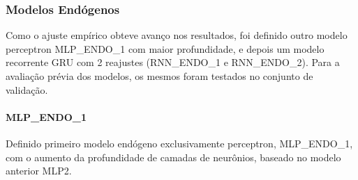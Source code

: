\documentclass[	12pt, Times, openright, twoside, a4paper, english, brazil]{abntex2}
\begin{document}
          \subsubsection{Modelos Endógenos}
    	        Como o ajuste empírico obteve avanço nos resultados, foi definido outro modelo perceptron MLP\_ENDO\_1 com maior profundidade, e depois um modelo recorrente GRU com 2 reajustes (RNN\_ENDO\_1 e RNN\_ENDO\_2).
                Para a avaliação prévia dos modelos, os mesmos foram testados no conjunto de validação.\newline
              \paragraph{MLP\_ENDO\_1}
                Definido primeiro modelo endógeno exclusivamente perceptron, MLP\_ENDO\_1, com o aumento da profundidade de camadas de neurônios, baseado no modelo anterior MLP2.
      	        \begin{figure}[H]
                \end{figure}
                
\end{document}
